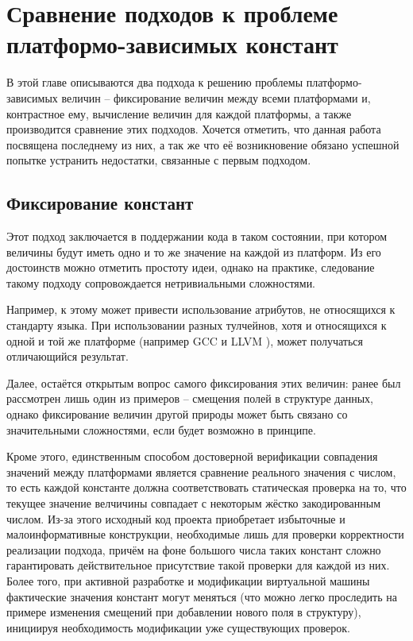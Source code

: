 \chapter[Сравнение подходов к проблеме]{Сравнение подходов к проблеме платформо-зависимых констант}
\label{sec:Chapter2} 

В этой главе описываются два подхода к решению проблемы платформо-зависимых величин -- фиксирование величин между всеми платформами и, контрастное ему, вычисление величин для каждой платформы, а также производится сравнение этих подходов. Хочется отметить, что данная работа посвящена последнему из них, а так же что её возникновение обязано успешной попытке устранить недостатки, связанные с первым подходом.

\section{Фиксирование констант}
Этот подход заключается в поддержании кода в таком состоянии, при котором величины будут иметь одно и то же значение на каждой из платформ.
Из его достоинств можно отметить простоту идеи, однако на практике, следование такому подходу сопровождается нетривиальными сложностями.
\par
Например, к этому может привести использование атрибутов, не относящихся к стандарту языка.
При использовании разных тулчейнов, хотя и относящихся к одной и той же платформе (например GCC\cite{gcc} и LLVM \cite{llvm}), может получаться отличающийся результат.
\par
Далее, остаётся открытым вопрос самого фиксирования этих величин: ранее был рассмотрен лишь один из примеров -- смещения полей в структуре данных, однако фиксирование величин другой природы может быть связано со значительными сложностями, если будет возможно в принципе.
\par
Кроме этого, единственным способом достоверной верификации совпадения значений между платформами является сравнение реального значения с числом, то есть каждой константе должна соответствовать статическая проверка на то, что текущее значение велчичины совпадает с некоторым жёстко закодированным числом.
Из-за этого исходный код проекта приобретает избыточные и малоинформативные конструкции, необходимые лишь для проверки корректности реализации подхода, причём на фоне большого числа таких констант сложно гарантировать действительное присутствие такой проверки для каждой из них.
Более того, при активной разработке и модификации виртуальной машины фактические значения констант могут меняться (что можно легко проследить на примере изменения смещений при добавлении нового поля в структуру), инициируя необходимость модификации уже существующих проверок.
